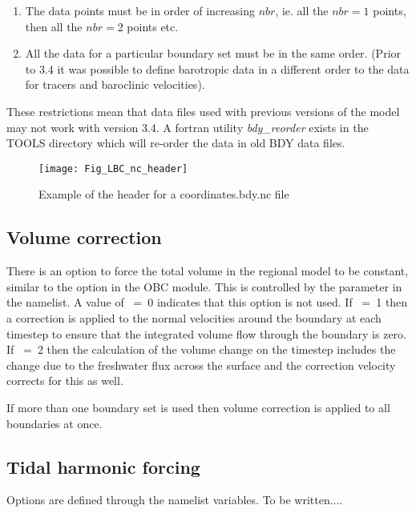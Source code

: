 \documentclass[NEMO_book]{subfiles}
\begin{document}
\mbox{}

\begin{enumerate}
\item The data points must be in order of increasing $nbr$, ie. all
  the $nbr=1$ points, then all the $nbr=2$ points etc.
\item All the data for a particular boundary set must be in the same
  order. (Prior to 3.4 it was possible to define barotropic data in a
  different order to the data for tracers and baroclinic velocities). 
\end{enumerate}

\mbox{}

These restrictions mean that data files used with previous versions of
the model may not work with version 3.4. A fortran utility
{\it bdy\_reorder} exists in the TOOLS directory which will re-order the
data in old BDY data files. 

\begin{figure}[!t]     \begin{center}
\texttt{[image: Fig\_LBC\_nc\_header]}
\caption {     \label{Fig_LBC_nc_header} 
Example of the header for a coordinates.bdy.nc file}
\end{center}   \end{figure}

\subsection{Volume correction}
\label{BDY_vol_corr}

There is an option to force the total volume in the regional model to be constant, 
similar to the option in the OBC module. This is controlled  by the  
parameter in the namelist. A value of ~=~0 indicates that this option is not used. 
If  ~=~1 then a correction is applied to the normal velocities 
around the boundary at each timestep to ensure that the integrated volume flow 
through the boundary is zero. If ~=~2 then the calculation of 
the volume change on the timestep includes the change due to the freshwater 
flux across the surface and the correction velocity corrects for this as well.

If more than one boundary set is used then volume correction is
applied to all boundaries at once.

\newpage
\subsection{Tidal harmonic forcing}
\label{BDY_tides}


Options are defined through the   namelist variables.
 To be written....
\end{document}
